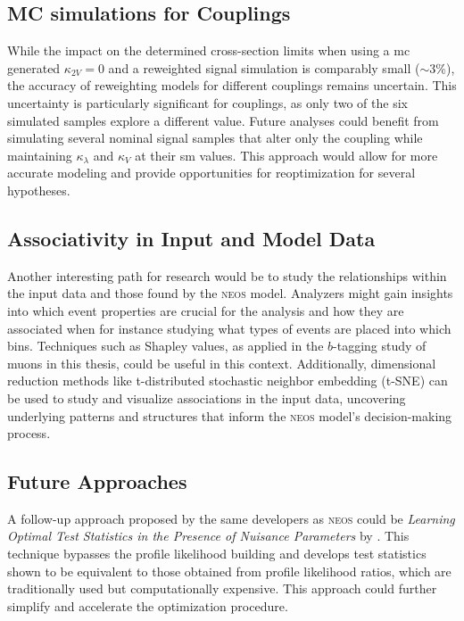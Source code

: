 \subsection{MC simulations for \ktwov Couplings}
While the impact on the determined cross-section limits when using a \ac{mc} generated $\kappa_{2V} = 0$ and a reweighted signal simulation is comparably small ($\sim$3\%), the accuracy of reweighting models for different \ktwov couplings remains uncertain. This uncertainty is particularly significant for \ktwov couplings, as only two of the six simulated samples explore a different \ktwov value. Future analyses could benefit from simulating several nominal signal samples that alter only the \ktwov coupling while maintaining $\kappa_\lambda$ and $\kappa_V$ at their \ac{sm} values. This approach would allow for more accurate modeling and provide opportunities for reoptimization for several \ktwov hypotheses.


\subsection{Associativity in Input and Model Data}
Another interesting path for research would be to study the relationships within the input data and those found by the \textsc{neos} model. Analyzers might gain insights into which event properties are crucial for the analysis and how they are associated when for instance studying what types of events are placed into which bins. Techniques such as Shapley values, as applied in the $b$-tagging study of muons in this thesis, could be useful in this context. Additionally, dimensional reduction methods like t-distributed stochastic neighbor embedding (t-SNE) can be used to study and visualize associations in the input data, uncovering underlying patterns and structures that inform the \textsc{neos} model's decision-making process.

\subsection{Future Approaches}

A follow-up approach proposed by the same developers as \textsc{neos} could be \textit{Learning Optimal Test Statistics in the Presence of Nuisance Parameters} by \citet{heinrich2022learningoptimalteststatistics}. This technique bypasses the profile likelihood building and develops test statistics shown to be equivalent to those obtained from profile likelihood ratios, which are traditionally used but computationally expensive. This approach could further simplify and accelerate the optimization procedure.

